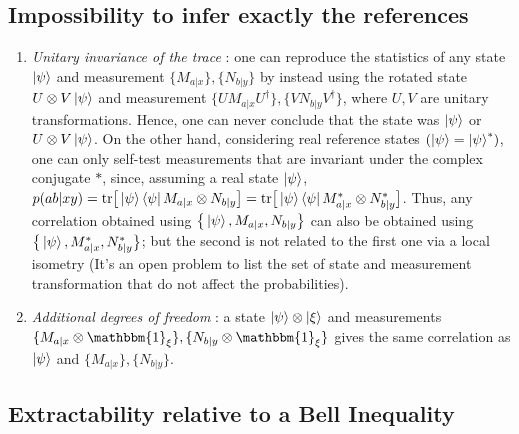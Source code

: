 \documentclass[12pt]{article}
\newcommand{\tr}[1]{\text{tr}\big[#1\big]}
\begin{document}
\begin{multicols}{2}
\subsection*{Impossibility to infer exactly the references}

\begin{enumerate}
	\item \textit{Unitary invariance of the trace} : one can reproduce the
		statistics of any state $\ket{\psi}$ and measurement $\{M_{a|x}\},
		\{N_{b|y}\}$ by instead using the rotated state $U \otimes V \ket{\psi}$
		and measurement $\{UM_{a|x}U^\dagger\}, \{VN_{b|y}V^\dagger\}$, where
		$U, V$ are unitary transformations. Hence, one can never conclude that
		the state was $\ket{\psi}$ or $U \otimes V \ket{\psi}$. \newline On the
		other hand, considering real reference states $(\ket{\psi} =
		\ket{\psi}^*)$, one can only self-test measurements that are invariant
		under the complex conjugate $*$, since, assuming a real state
		$\ket{\psi}$, $p(ab|xy) = \tr{\ket{\psi}\bra{\psi} M_{a|x}
		\otimes N_{b|y}} = \tr{\ket{\psi}\bra{\psi} M_{a|x}^*
		\otimes N_{b|y}^*}$. Thus, any correlation obtained using
		$\big\{\ket{\psi}, M_{a|x}, N_{b|y} \big\}$ can also be obtained using
		$\big\{\ket{\psi}, M_{a|x}^*, N_{b|y}^* \big\}$; but the second is not
		related to the first one via a local isometry (It's an open problem to
		list the set of state and measurement transformation that do not affect
		the probabilities).

	\item \textit{Additional degrees of freedom} : a state $\ket{\psi} \otimes
		\ket \xi$ and measurements $\{M_{a|x} \otimes \mathbbm{1}_\xi\},
		\{N_{b|y} \otimes \mathbbm{1}_\xi\}$ gives the same correlation as
		$\ket{\psi}$ and $\{M_{a|x}\}, \{N_{b|y}\}$.
\end{enumerate}


\subsection*{Extractability relative to a Bell Inequality}


\end{multicols}
\end{document}

